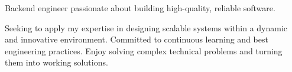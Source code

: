 \par{
Backend engineer passionate about building high-quality, reliable software.

Seeking to apply my expertise in designing scalable systems within a dynamic and innovative environment. Committed to continuous learning and best engineering practices. Enjoy solving complex technical problems and turning them into working solutions.
}
\vspace{1em}
